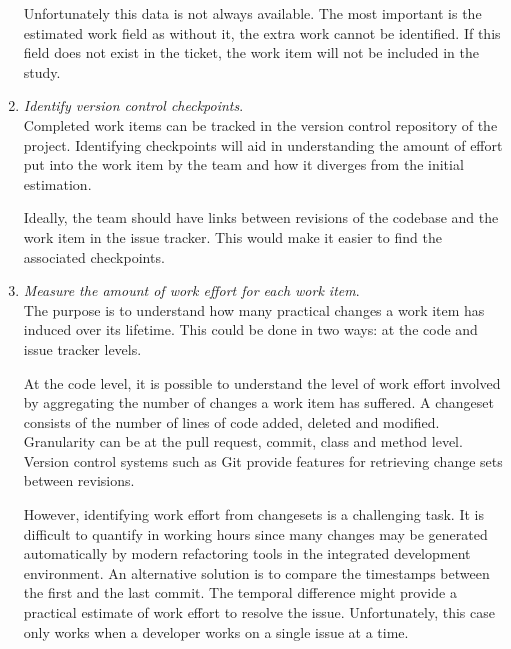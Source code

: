 \documentclass{mprop}
\begin{document}
\begin{enumerate}
	      Unfortunately this data is not always available. The most important is
	      the estimated work field as without it, the extra work cannot be
	      identified. If this field does not exist in the ticket, the work item
	      will not be included in the study.

	\item \textit{Identify version control checkpoints}.\\
	      Completed work items can be tracked in the version control repository
	      of the project. Identifying checkpoints will aid in understanding the
	      amount of effort put into the work item by the team and how it
	      diverges from the initial estimation.

	      Ideally, the team should have links between revisions of the codebase and
	      the work item in the issue tracker. This would make it easier to find the
	      associated checkpoints.

	\item \textit{Measure the amount of work effort for each work item}.\\
	      The purpose is to understand how many practical changes a work item
	      has induced over its lifetime. This could be done in two ways: at the
	      code and issue tracker levels.

	      At the code level, it is possible to understand the level of work
	      effort involved by aggregating the number of changes a work item has
	      suffered. A changeset consists of the number of lines of code added,
	      deleted and modified. Granularity can be at the pull request, commit,
	      class and method level. Version control systems such as Git provide
	      features for retrieving change sets between revisions.

	      However, identifying work effort from changesets is a challenging
	      task. It is difficult to quantify in working hours since many changes
	      may be generated automatically by modern refactoring tools in the
	      integrated development environment. An alternative solution is to
	      compare the timestamps between the first and the last commit. The
	      temporal difference might provide a practical estimate of work effort
	      to resolve the issue. Unfortunately, this case only works when a
	      developer works on a single issue at a time.


\end{enumerate}
\end{document}
